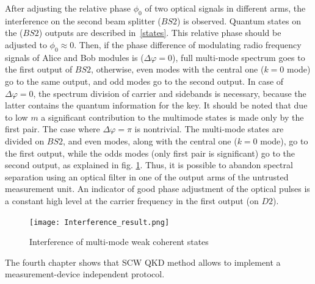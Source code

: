 After adjusting the relative phase $\phi_0$ of two optical signals in different arms, the interference on the second beam splitter ($BS2$) is observed. Quantum states on the ($BS2$) outputs are described in~\ref{states}. This relative phase should be adjusted to $\phi_0\approx0$. Then, if the phase difference of modulating radio frequency signals of Alice and Bob modules is ($\Delta\varphi=0$), full multi-mode spectrum goes to the first output of $BS2$, otherwise, even modes with the central one ($k = 0$ mode) go to the same output, and odd modes go to the second output. In case of $\Delta\varphi=0$, the spectrum division of carrier and sidebands is necessary, because the latter contains the quantum information for the key. It should be noted that due to low $m$ a significant contribution to the multimode states is made only by the first pair. The case where $\Delta\varphi=\pi$ is nontrivial. The multi-mode states are divided on $BS2$, and even modes, along with the central one ($k = 0$ mode), go to the first output, while the odds modes (only first pair is significant) go to the second output, as explained in fig. \ref{fig:Interference_result}. Thus, it is possible to abandon spectral separation using an optical filter in one of the output arms of the untrusted measurement unit. An indicator of good phase adjustment of the optical pulses is a constant high level at the carrier frequency in the first output (on $D2$).  


\begin{figure}[ht]
 \centering
  \texttt{[image: Interference\_result.png]}
  \caption{Interference of multi-mode weak coherent states}
  \label{fig:Interference_result}
\end{figure}

 
The fourth chapter shows that SCW QKD method allows to implement a measurement-device independent protocol.

